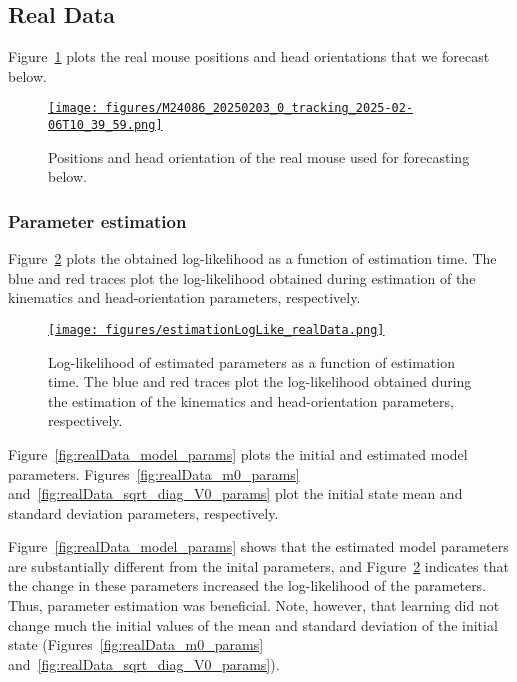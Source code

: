 \documentclass[12pt]{article}
\begin{document}
\subsection{Real Data}
\label{sec:realData}

Figure~\ref{fig:real_posAndHO} plots the real mouse positions and head
orientations that we forecast below.

\begin{figure}
    \centering
    \href{https://www.gatsby.ucl.ac.uk/~rapela/aman/reports/ekfForKinematicsAndHeadOrientation/figures/M24086_20250203_0_tracking_2025-02-06T10_39_59.html}{\texttt{[image: figures/M24086\_20250203\_0\_tracking\_2025-02-06T10\_39\_59.png]}}
    \caption{Positions and head orientation of the real mouse used for
    forecasting below.}
    \label{fig:real_posAndHO}
\end{figure}

\subsubsection*{Parameter estimation}

Figure~\ref{fig:realData_logLike} plots the obtained
log-likelihood as a function of estimation time. The blue and red traces plot the
log-likelihood obtained during estimation of the kinematics and
head-orientation parameters, respectively.

\begin{figure}
    \centering
    \href{https://www.gatsby.ucl.ac.uk/~rapela/aman/reports/ekfForKinematicsAndHeadOrientation/figures/estimationLogLike_realData.html}{\texttt{[image: figures/estimationLogLike\_realData.png]}}
    \caption{Log-likelihood of estimated parameters as a function of estimation
    time. The blue and red traces plot the log-likelihood obtained during the
    estimation of the kinematics and head-orientation parameters,
    respectively.}
    \label{fig:realData_logLike}
\end{figure}

Figure~\ref{fig:realData_model_params} plots the initial and estimated model
parameters. Figures~\ref{fig:realData_m0_params}
and~\ref{fig:realData_sqrt_diag_V0_params} plot the initial
state mean and standard deviation parameters, respectively.

Figure~\ref{fig:realData_model_params} shows that the estimated model
parameters are substantially different from the inital parameters, and
Figure~\ref{fig:realData_logLike} indicates that the change in these parameters
increased the log-likelihood of the parameters. Thus, parameter estimation was
beneficial.
%
Note, however, that learning did not change much the initial values of the
mean and standard deviation of the initial state
(Figures~\ref{fig:realData_m0_params}
and~\ref{fig:realData_sqrt_diag_V0_params}).
\end{document}
